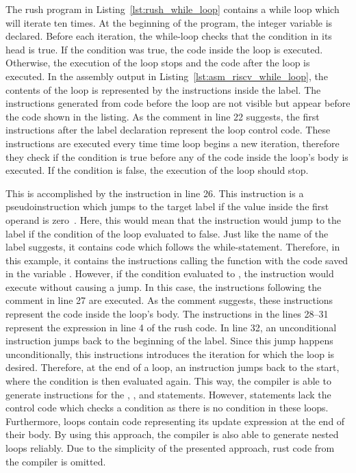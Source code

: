 The rush program in Listing~\ref{lst:rush_while_loop} contains a while loop which will iterate ten times.
At the beginning of the program, the integer variable  is declared.
Before each iteration, the while-loop checks that the condition in its head is true.
If the condition was true, the code inside the loop is executed.
Otherwise, the execution of the loop stops and the code after the loop is executed.
In the assembly output in Listing~\ref{lst:asm_riscv_while_loop}, the contents of the loop is represented by the instructions inside the  label.
The instructions generated from code before the loop are not visible but appear before the code shown in the listing.
As the comment in line 22 suggests, the first instructions after the label declaration represent the loop control code.
These instructions are executed every time time loop begins a new iteration, therefore they check if the condition is true before any of the code inside the loop's body is executed.
If the condition is false, the execution of the loop should stop.

This is accomplished by the  instruction in line 26.
This instruction is a pseudoinstruction which jumps to the target label if the value inside the first operand is zero~\cite[p.~105]{Waterman2019}.
Here, this would mean that the instruction would jump to the  label if the condition of the loop evaluated to false.
Just like the name of the  label suggests, it contains code which follows the while-statement.
Therefore, in this example, it contains the instructions calling the  function with the code saved in the variable .
However, if the condition evaluated to , the  instruction would execute without causing a jump.
In this case, the instructions following the comment in line 27 are executed.
As the comment suggests, these instructions represent the code inside the loop's body.
The instructions in the lines 28--31 represent the expression  in line 4 of the rush code.
In line 32, an unconditional  instruction jumps back to the beginning of the  label.
Since this jump happens unconditionally, this instructions introduces the iteration for which the loop is desired.
Therefore, at the end of a loop, an instruction jumps back to the start, where the condition is then evaluated again.
This way, the compiler is able to generate instructions for the , , and  statements.
However,  statements lack the control code which checks a condition as there is no condition in these loops.
Furthermore,  loops contain code representing its update expression at the end of their body.
By using this approach, the compiler is also able to generate nested loops reliably.
Due to the simplicity of the presented approach, rust code from the compiler is omitted.

